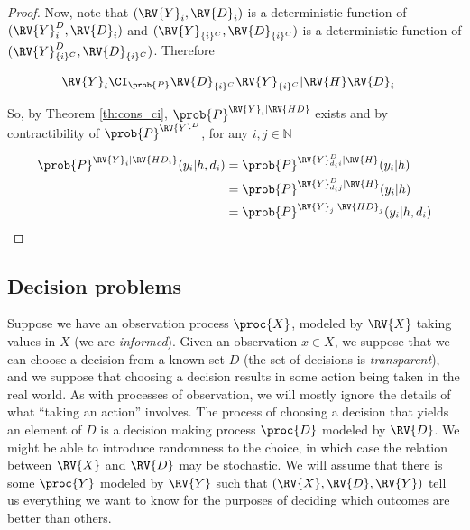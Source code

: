 \begin{proof}
Now, note that $(\RV{Y}_i,\RV{D}_i)$ is a deterministic function of $(\RV{Y}^D_{i},\RV{D}_i)$ and $(\RV{Y}_{\{i\}^C},\RV{D}_{\{i\}^C})$ is a deterministic function of $(\RV{Y}^D_{\{i\}^C},\RV{D}_{\{i\}^C})$. Therefore

\begin{align}
    &\RV{Y}_i \CI_{\prob{P}} \RV{D}_{\{i\}^C}\RV{Y}_{\{i\}^C} |\RV{H}\RV{D}_i&
\end{align}

So, by Theorem \ref{th:cons_ci}, $\prob{P}^{\RV{Y}_i|\RV{HD}}$ exists and by contractibility of $\prob{P}^{\RV{Y}^D}$, for any $i,j\in\mathbb{N}$

\begin{align}
    \prob{P}^{\RV{Y}_i|\RV{HD_i}}(y_i|h,d_i) &= \prob{P}^{\RV{Y}^D_{d_i i}|\RV{H}}(y_i|h) \\
    &= \prob{P}^{\RV{Y}^D_{d_i j}|\RV{H}}(y_i|h)\\
    &= \prob{P}^{\RV{Y}_j|\RV{HD}_j}(y_i|h,d_i)
\end{align}
\end{proof}


\subsection{Decision problems}

Suppose we have an observation process $\proc{X}$, modeled by $\RV{X}$ taking values in $X$ (we are \emph{informed}). Given an observation $x\in X$, we suppose that we can choose a decision from a known set $D$ (the set of decisions is \emph{transparent}), and we suppose that choosing a decision results in some action being taken in the real world. As with processes of observation, we will mostly ignore the details of what ``taking an action'' involves. The process of choosing a decision that yields an element of $D$ is a decision making process $\proc{D}$ modeled by $\RV{D}$. We might be able to introduce randomness to the choice, in which case the relation between $\RV{X}$ and $\RV{D}$ may be stochastic.  We will assume that there is some $\proc{Y}$ modeled by $\RV{Y}$ such that $(\RV{X},\RV{D},\RV{Y})$ tell us everything we want to know for the purposes of deciding which outcomes are better than others.

